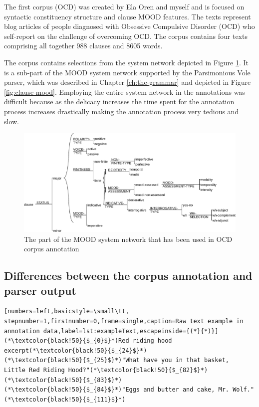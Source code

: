      The first corpus (OCD) was created by Ela Oren and myself and is focused on syntactic constituency structure and clause MOOD features. The texts represent blog articles of people diagnosed with Obsessive Compulsive Disorder (OCD) who self-report on the challenge of overcoming OCD. The corpus contains four texts comprising all together 988 clauses and 8605 words. 

    The corpus contains selections from the system network depicted in Figure \ref{fig:mood-ocd-simplified}. It is a sub-part of the MOOD system network supported by the Parsimonious Vole parser, which was described in Chapter \ref{ch:the-grammar} and depicted in Figure \ref{fig:clause-mood}. Employing the entire system network in the annotations was difficult because as the delicacy increases the time spent for the annotation process increases drastically making the annotation process very tedious and slow.
    
    \begin{figure}[!ht]
        \centering
        \includegraphics[width=.85\textwidth]{Figures/Evaluation/ocd1-mood-simplified.pdf}
        \caption{The part of the MOOD system network that has been used in OCD corpus annotation}
        \label{fig:mood-ocd-simplified}
    \end{figure}

\subsection{Differences between the corpus annotation and parser output}
\label{sec:differences}

\begin{minipage}{\linewidth}
\begin{lstlisting}[numbers=left,basicstyle=\small\tt, stepnumber=1,firstnumber=0,frame=single,caption=Raw text example in annotation data,label=lst:exampleText,escapeinside={(*}{*)}]
(*\textcolor{black!50}{$_{0}$}*)Red riding hood excerpt(*\textcolor{black!50}{$_{24}$}*)
(*\textcolor{black!50}{$_{25}$}*)"What have you in that basket,   Little Red Riding Hood?"(*\textcolor{black!50}{$_{82}$}*)
(*\textcolor{black!50}{$_{83}$}*)
(*\textcolor{black!50}{$_{84}$}*)"Eggs and butter and cake, Mr. Wolf."(*\textcolor{black!50}{$_{111}$}*)
\end{lstlisting}
\end{minipage}

